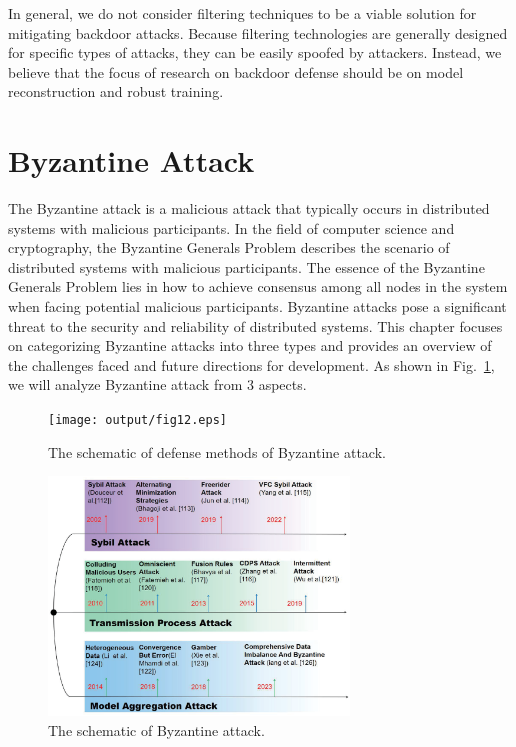 \documentclass[a4paper,fleqn]{cas-dc}
\begin{document}
In general, we do not consider filtering techniques to be
a viable solution for mitigating backdoor attacks. Because
filtering technologies are generally designed for specific
types of attacks, they can be easily spoofed by attackers.
Instead, we believe that the focus of research on backdoor
defense should be on model reconstruction and robust
training.

\section{Byzantine Attack}
The Byzantine attack is a malicious attack that
typically occurs in distributed systems with malicious
participants. In the field of computer science and cryptography,
the Byzantine Generals Problem describes the scenario
of distributed systems with malicious participants. The
essence of the Byzantine Generals Problem lies in how
to achieve consensus among all nodes in the system
when facing potential malicious participants. Byzantine
attacks pose a significant threat to the security and
reliability of distributed systems. This chapter focuses
on categorizing Byzantine attacks into three types and
provides an overview of the challenges faced and future
directions for development. As shown in Fig.~\ref{fig13}, we will
analyze Byzantine attack from 3 aspects.

\begin{figure}[htbp]
	\centering
	\begin{minipage}{0.49\linewidth}
		\centering
		\texttt{[image: output/fig12.eps]}
		\caption{The schematic of defense methods of Byzantine attack.}
		\label{fig12}
	\end{minipage}
	\begin{minipage}{0.49\linewidth}
		\centering
		\includegraphics[width=1.0\linewidth,height=2.5in]{output/fig13.eps}
		\caption{The schematic of Byzantine attack.}
		\label{fig13}
	\end{minipage}
\end{figure}
\end{document}
